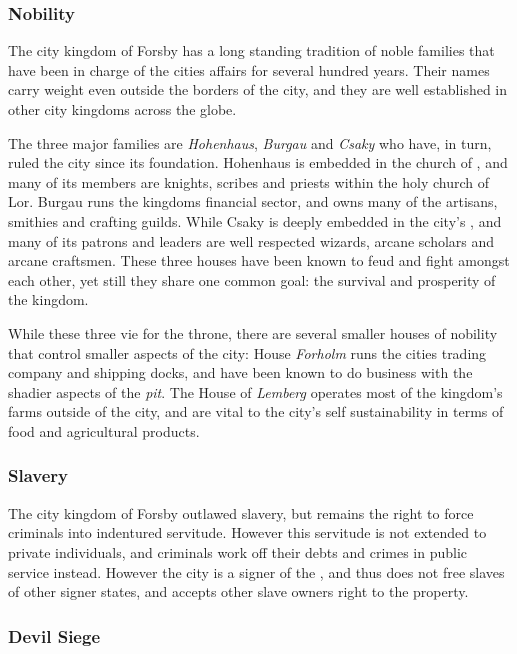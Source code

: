 \subsubsection{Nobility}

The city kingdom of Forsby has a long standing tradition of noble
families that have been in charge of the cities affairs for several hundred
years. Their names carry weight even outside the borders of the city, and
they are well established in other city kingdoms across the globe.

The three major families are \emph{Hohenhaus}, \emph{Burgau} and \emph{Csaky}
who have, in turn, ruled the city since its foundation. Hohenhaus is embedded
in the church of , and many of its members are knights,
scribes and priests within the holy church of Lor. Burgau runs the kingdoms
financial sector, and owns many of the artisans, smithies and crafting
guilds. While Csaky is deeply embedded in the city's , and many of its patrons and leaders are well respected wizards,
arcane scholars and arcane craftsmen. These three houses have been known to
feud and fight amongst each other, yet still they share one common goal: the
survival and prosperity of the kingdom.

While these three vie for the throne, there are several smaller houses of
nobility that control smaller aspects of the city: House \emph{Forholm} runs
the cities trading company and shipping docks, and have been known to do
business with the shadier aspects of the \emph{pit}. The House of
\emph{Lemberg} operates most of the kingdom's farms outside of the city, and
are vital to the city's self sustainability in terms of food and agricultural
products.

\subsubsection{Slavery}

The city kingdom of Forsby outlawed slavery, but remains the right to force
criminals into indentured servitude. However this servitude is not extended
to private individuals, and criminals work off their debts and crimes in public
service instead. However the city is a signer of the ,
and thus does not free slaves of other signer states, and accepts other slave
owners right to the property.

\subsubsection{Devil Siege}
\label{sec:Devil Siege}

